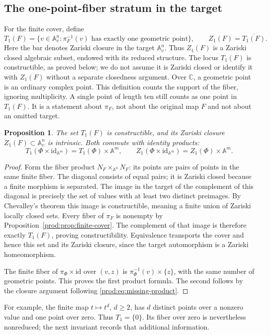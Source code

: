 \documentclass[11pt]{article}
\numberwithin{equation}{section}
\theoremstyle{plain}
\newtheorem{proposition}[theorem]{Proposition}
\theoremstyle{definition}
\theoremstyle{remark}
\newcommand{\C}{\mathbb{C}}
\newcommand{\A}{\mathbb{A}}
\newcommand{\id}{\mathrm{id}}
\begin{document}
\subsection{The one-point-fiber stratum in the target}
For the finite cover, define
\[
 T_1(F)=\{v\in\A^n_v:\pi_F^{-1}(v)\text{ has exactly one geometric point}\},
 \qquad Z_1(F)=\overline{T_1(F)}.
\]
Here the bar denotes Zariski closure in the target $\A^n_v$.
Thus $Z_1(F)$ is a Zariski closed algebraic subset, endowed with its
reduced structure. The locus $T_1(F)$ is constructible, as proved below;
we do not assume it is Zariski closed or identify it with $Z_1(F)$
without a separate closedness argument.
Over $\C$, a geometric point is an ordinary complex point. This definition
counts the support of the fiber, ignoring multiplicity. A single point of
length ten still counts as one point in $T_1(F)$. It is a statement about
$\pi_F$, not about the original map $F$ and not about an omitted target.

\begin{proposition}\label{prod:prop:one-point}
The set $T_1(F)$ is constructible, and its Zariski closure
$Z_1(F)\subset\A^n_v$ is intrinsic. Both commute with identity products:
\[
 T_1(\Phi\times\id_{\A^m})=T_1(\Phi)\times\A^m,\qquad
 Z_1(\Phi\times\id_{\A^m})=Z_1(\Phi)\times\A^m.
\]
\end{proposition}
\begin{proof}
Form the fiber product $N_F\times_{\A^n}N_F$: its points are pairs of
points in the same finite fiber. The diagonal consists of equal pairs;
it is Zariski closed because a finite morphism is separated. The image in the
target of the complement of this diagonal is precisely the set of values
with at least two distinct preimages. By Chevalley's theorem this image
is constructible, meaning a finite union of Zariski locally closed sets. Every
fiber of $\pi_F$ is nonempty by Proposition~\ref{prod:prop:finite-cover}.
The complement of that image is therefore exactly $T_1(F)$, proving
constructibility. Equivalence transports the cover and hence this set
and its Zariski closure, since the target automorphism is a Zariski
homeomorphism.

The finite fiber of $\pi_\Phi\times\id$ over $(v,z)$ is
$\pi_\Phi^{-1}(v)\times\{z\}$, with the same number of geometric points.
This proves the first product formula. The second follows by the closure
argument following \eqref{prod:eq:missing-product}.
\end{proof}

For example, the finite map $t\mapsto t^d$, $d\geq2$, has $d$ distinct
points over a nonzero value and one point over zero. Thus $T_1=\{0\}$.
Its fiber over zero is nevertheless nonreduced; the next invariant records
that additional information.
\end{document}
